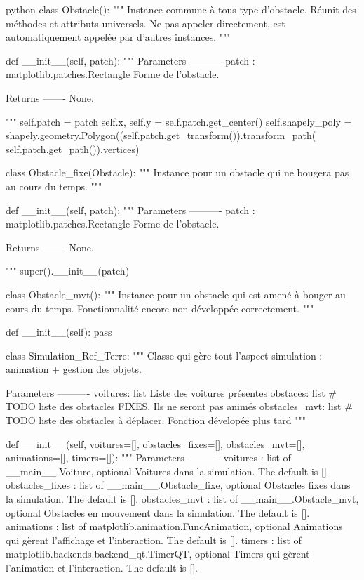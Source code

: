 \begin{mintedbox}{python}
class Obstacle():
    """
    Instance commune à tous type d'obstacle. Réunit des méthodes et attributs universels. Ne pas appeler directement, est automatiquement appelée par d'autres instances.
    """

    def __init__(self, patch):
        """
        Parameters
        ----------
        patch : matplotlib.patches.Rectangle
            Forme de l'obstacle.

        Returns
        -------
        None.

        """
        self.patch = patch
        self.x, self.y = self.patch.get_center()
        self.shapely_poly = shapely.geometry.Polygon((self.patch.get_transform()).transform_path( self.patch.get_path()).vertices)


class Obstacle_fixe(Obstacle):
    """
    Instance pour un obstacle qui ne bougera pas au cours du temps.
    """

    def __init__(self, patch):
        """
        Parameters
        ----------
        patch : matplotlib.patches.Rectangle
            Forme de l'obstacle.

        Returns
        -------
        None.

        """
        super().__init__(patch)


class Obstacle_mvt():
    """
    Instance pour un obstacle qui est amené à bouger au cours du temps. Fonctionnalité encore non développée correctement.
    """

    def __init__(self):
        pass


class Simulation_Ref_Terre:
    """
    Classe qui gère tout l'aspect simulation : animation + gestion des objets.

    Parameters
    ----------
    voitures: list
        Liste des voitures présentes
    obstaces: list  # TODO
        liste des obstacles FIXES. Ils ne seront pas animés
    obstacles_mvt: list  # TODO
        liste des obstacles à déplacer. Fonction dévelopée plus tard
    """

    def __init__(self, voitures=[], obstacles_fixes=[], obstacles_mvt=[], animations=[], timers=[]):
        """
        Parameters
        ----------
        voitures : list of __main__.Voiture, optional
            Voitures dans la simulation. The default is [].
        obstacles_fixes : list of __main__.Obstacle_fixe, optional
            Obstacles fixes dans la simulation. The default is [].
        obstacles_mvt : list of __main__.Obstacle_mvt, optional
            Obstacles en mouvement dans la simulation. The default is [].
        animations : list of matplotlib.animation.FuncAnimation, optional
            Animations qui gèrent l'affichage et l'interaction. The default is [].
        timers : list of matplotlib.backends.backend_qt.TimerQT, optional
            Timers qui gèrent l'animation et l'interaction. The default is [].


\end{mintedbox}
